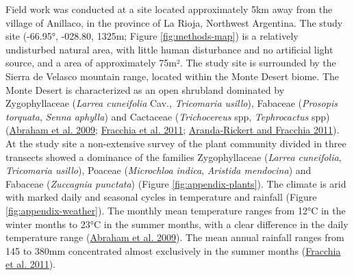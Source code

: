 \documentclass[msc,numbers,hidelinks]{coppe}
\begin{document}
  Field work was conducted at a site located approximately 5km away from the village of Anillaco, in the province of La Rioja, Northwest Argentina. The study site (-66.95°, -028.80, 1325m; Figure \ref{fig:methods-map}) is a relatively undisturbed natural area, with little human disturbance and no artificial light source, and a area of approximately 75m². The study site is surrounded by the Sierra de Velasco mountain range, located within the Monte Desert biome. The Monte Desert is characterized as an open shrubland dominated by Zygophyllaceae (\emph{Larrea cuneifolia} Cav., \emph{Tricomaria usillo}), Fabaceae (\emph{Prosopis torquata}, \emph{Senna aphylla}) and Cactaceae (\emph{Trichocereus} spp, \emph{Tephrocactus} spp) (\protect\hyperlink{ref-abraham2009}{Abraham et al. 2009}; \protect\hyperlink{ref-fracchia2011}{Fracchia et al. 2011}; \protect\hyperlink{ref-aranda-rickert2011a}{Aranda-Rickert and Fracchia 2011}). At the study site a non-extensive survey of the plant community divided in three transects showed a dominance of the families Zygophyllaceae (\emph{Larrea cuneifolia}, \emph{Tricomaria usillo}), Poaceae (\emph{Microchloa indica}, \emph{Aristida mendocina}) and Fabaceae (\emph{Zuccagnia punctata}) (Figure \ref{fig:appendix-plants}). The climate is arid with marked daily and seasonal cycles in temperature and rainfall (Figure \ref{fig:appendix-weather}). The monthly mean temperature ranges from 12°C in the winter months to 23°C in the summer months, with a clear difference in the daily temperature range (\protect\hyperlink{ref-abraham2009}{Abraham et al. 2009}). The mean annual rainfall ranges from 145 to 380mm concentrated almost exclusively in the summer months (\protect\hyperlink{ref-fracchia2011}{Fracchia et al. 2011}).
\end{document}
